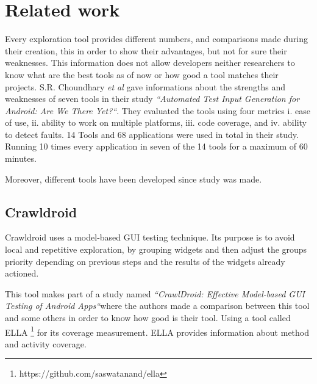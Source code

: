 
\chapter{Related work} %
\label{Chapter2} %


Every exploration tool provides different numbers, and comparisons made during their creation, this in order to show their advantages, but not for sure their weaknesses. This information does not allow developers neither researchers to know what are the best tools as of now or how good a tool matches their projects. 
S.R. Choundhary \textit{et al} \cite{Choudhary} gave informations about the strengths and weaknesses of seven tools in their study \textit{``Automated Test Input Generation for Android: Are We There Yet?``}. They evaluated the tools using four metrics i. ease
of use, ii. ability to work on multiple platforms, iii. code coverage, and iv.
ability to detect faults. 14 Tools and 68 applications were used in total in their study. Running 10 times every application in seven of the 14 tools for a maximum of 60 minutes.

Moreover, different tools have been developed since \cite{Choudhary} study was made.

\section{Crawldroid}\label{sec:crawldroid}

Crawldroid \cite{Cao} uses a model-based GUI testing technique. Its purpose is to avoid local and repetitive exploration, by grouping widgets and then adjust the groups priority depending on previous steps and the results of the widgets already actioned. 

This tool makes part of a study named \textit{``CrawlDroid: Effective Model-based GUI Testing of Android Apps``}where the authors made a comparison between this tool and some others in order to know how good is their tool. Using a tool called ELLA \footnote{https://github.com/saswatanand/ella} for its coverage measurement. ELLA provides information about method and activity coverage.

